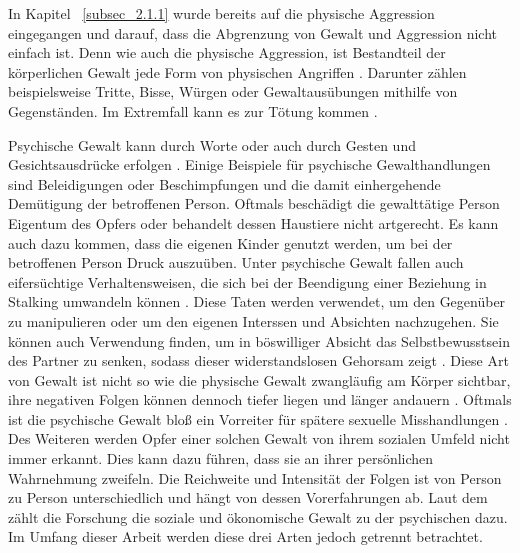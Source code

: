 In Kapitel ~\ref{subsec_2.1.1} wurde bereits auf die physische Aggression eingegangen und darauf, dass die Abgrenzung von Gewalt und Aggression nicht einfach ist. Denn wie auch die physische Aggression, ist Bestandteil der körperlichen Gewalt jede Form von physischen Angriffen \parencite{ph_G_wie_aggro}. Darunter zählen beispielsweise Tritte, Bisse, Würgen oder Gewaltausübungen mithilfe von Gegenständen. Im Extremfall kann es zur Tötung kommen \parencite{Gewaltart, Def_haus_Gewalt, physische_Gewalt_wie_aggro, Def_Form_Folge_Gewalt}.

Psychische Gewalt kann durch Worte oder auch durch Gesten und Gesichtsausdrücke erfolgen \parencite{Def_haus_Gewalt_2}. Einige Beispiele für psychische Gewalthandlungen sind Beleidigungen oder Beschimpfungen und die damit einhergehende Demütigung der betroffenen Person. Oftmals beschädigt die gewalttätige Person Eigentum des Opfers oder behandelt dessen Haustiere nicht artgerecht. Es kann auch dazu kommen, dass die eigenen Kinder genutzt werden, um bei der betroffenen Person Druck auszuüben. Unter psychische Gewalt fallen auch  eifersüchtige Verhaltensweisen, die sich bei der Beendigung einer Beziehung in Stalking umwandeln können \parencite{Def_Form_Folge_Gewalt, Gewaltart, Def_haus_Gewalt_2}. Diese Taten werden verwendet, um den Gegenüber zu manipulieren oder um den eigenen Interssen und Absichten nachzugehen. Sie können auch Verwendung finden, um in böswilliger Absicht das Selbstbewusstsein des Partner zu senken, sodass dieser widerstandslosen Gehorsam zeigt \parencite{Def_haus_Gewalt_2}. Diese Art von Gewalt ist nicht so wie die physische Gewalt zwangläufig am Körper sichtbar, ihre negativen Folgen können dennoch tiefer liegen und länger andauern \parencite{psych_Gewalt}. Oftmals ist die psychische Gewalt bloß ein Vorreiter für spätere sexuelle Misshandlungen \parencite{psych_Gewalt_2}. Des Weiteren werden Opfer einer solchen Gewalt von ihrem sozialen Umfeld nicht immer erkannt. Dies kann dazu führen, dass sie an ihrer persönlichen Wahrnehmung zweifeln. Die Reichweite und Intensität der Folgen ist von Person zu Person unterschiedlich und hängt von dessen Vorerfahrungen ab. Laut dem \textcite{Def_Form_Folge_Gewalt} zählt die Forschung die soziale und ökonomische Gewalt zu der psychischen dazu. Im Umfang dieser Arbeit werden diese drei Arten jedoch getrennt betrachtet. 

